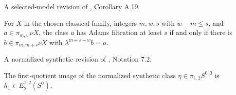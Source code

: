 \begin{theorem}
\label{frontier:Literature:436802be2502}
A selected-model revision of \cite{BHS}, Corollary A.19.\par

For $X$ in the chosen classical family, integers $m,w,s$ with $w-m\le s$, and $a\in\pi_{m,w}\nu X$, the class $a$ has Adams filtration at least $s$ if and only if there is $b\in\pi_{m,m+s}\nu X$ with $\lambda^{m+s-w}b=a$.
\end{theorem}

\begin{theorem}
\label{frontier:Literature:48d4b249a919}
A normalized synthetic revision of \cite{LWX126}, Notation 7.2.\par

The first-quotient image of the normalized synthetic class $\eta\in\pi_{1,2}S^{0,0}$ is $h_1\in E_2^{1,2}(S^0)$.
\end{theorem}

